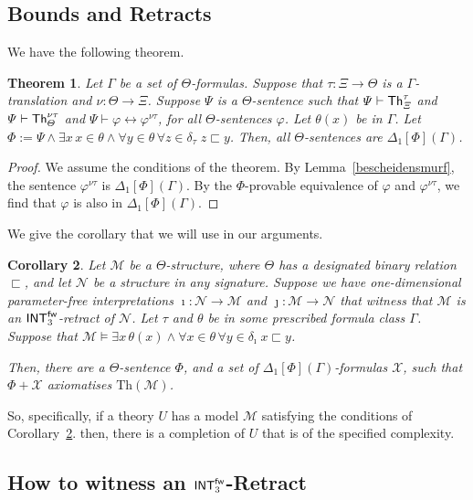 \documentclass{amsart}
\renewcommand{\iff}{\leftrightarrow}
\renewcommand{\phi}{\varphi}
\renewcommand{\Theta}{\varTheta}
\renewcommand{\Phi}{\varPhi}
\renewcommand{\Psi}{\varPsi}
\renewcommand{\Xi}{\varXi}
\renewcommand{\Gamma}{\varGamma}
\newtheorem{theorem}{Theorem}[section]
\newtheorem{cor}[theorem]{Corollary}
\newcommand{\mc}[1]{\mathcal #1}
\newcommand{\bin}{\mathbin{\in}}
\newcommand{\belowz}{\sqsubset}
\newcommand{\below}[2]{#1\sqsubset #2}
\newcommand{\fol}[1]{{\sf Th}_{#1}}
\begin{document}
\subsection{Bounds and Retracts}
 We have the following theorem.

\begin{theorem}\label{grotesmurf}
Let $\Gamma$ be a set of $\Theta$-formulas. Suppose that $\tau:\Xi \to \Theta$ is a $\Gamma$-translation and $\nu:\Theta\to \Xi$.
Suppose $\Psi$ is a $\Theta$-sentence such that $\Psi \vdash \fol{\Xi}^\tau$ and $\Psi \vdash \fol{\Theta}^{\nu\tau}$ and
$\Psi \vdash \phi \iff \phi^{\nu \tau}$, for all $\Theta$-sentences $\phi$. 
Let $\theta(x)$ be in $\Gamma$. Let $\Phi := \Psi \wedge \exists x\, x\in\theta \wedge
    \forall  y \bin \theta\, \forall  z\bin \delta_\tau \; \below zy$. 
Then, all $\Theta$-sentences are $\Delta_1[\Phi](\Gamma)$.
\end{theorem}
%
\begin{proof}
We assume the conditions of the theorem. By Lemma~\ref{bescheidensmurf}, the sentence
$\phi^{\nu\tau}$ is $\Delta_1[\Phi](\Gamma)$. By the $\Phi$-provable equivalence of
$\phi$ and $\phi^{\nu\tau}$, we find that $\phi$ is also in $\Delta_1[\Phi](\Gamma)$.
\end{proof}
%
We give the corollary that we will use in our arguments.

\begin{cor}\label{cor_mod_retract}
Let  $\mc{M}$ be a $\Theta$-structure, where $\Theta$ has a designated binary relation $\belowz$,
and let $\mc{N}$ be a structure in any signature.
Suppose we have one-dimensional parameter-free interpretations $\imath: \mc{N}\to \mc M$ and 
$\jmath: \mc M\to \mc{N}$ that witness that $\mc M$ is an ${\sf INT}_3^{\sf fw}$-retract of $\mc {N}$.
 Let $\tau$ and $\theta$ be in some prescribed formula class $\Gamma$.
Suppose that 
$\mc M \models  \exists x\, \theta(x) \wedge \forall x\bin \theta\, \forall y\bin \delta_{\imath}\; \below {x}{y}$.

Then, there are a $\Theta$-sentence $\Phi$, and a set 
of $\Delta_1[\Phi](\Gamma)$-formulas $\mc X$, such 
that $\Phi+\mc X$ axiomatises  $\mathrm{Th}(\mc{M})$.
\end{cor}
So,  specifically, if a theory $U$ has a model $\mc M$ satisfying the conditions of Corollary~\ref{cor_mod_retract}.
then, there is a completion of $U$ that is of the specified complexity.

\subsection{How to witness an  ${\sf INT}_3^{\sf fw}$-Retract}\label{Sec_witness}
\end{document}
